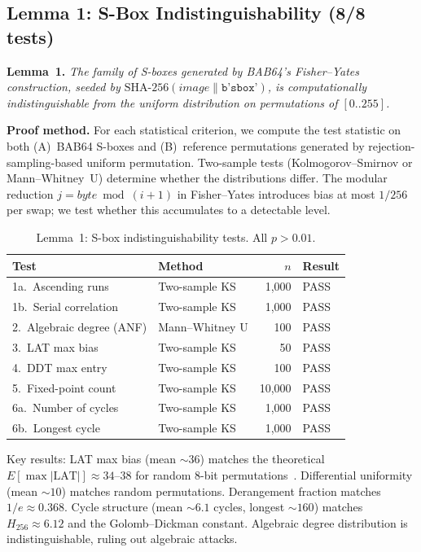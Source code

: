 \documentclass[preprint]{iacrtrans}
\begin{document}
\subsection{Lemma 1: S-Box Indistinguishability (8/8 tests)}

\textbf{Lemma~1.} \emph{The family of S-boxes generated by BAB64's Fisher--Yates construction, seeded by $\mathrm{SHA\text{-}256}(\mathit{image} \| \texttt{b'sbox'})$, is computationally indistinguishable from the uniform distribution on permutations of $[0..255]$.}

\textbf{Proof method.} For each statistical criterion, we compute the test statistic on both (A)~BAB64 S-boxes and (B)~reference permutations generated by rejection-sampling-based uniform permutation. Two-sample tests (Kolmogorov--Smirnov or Mann--Whitney~U) determine whether the distributions differ. The modular reduction $j = \mathit{byte} \bmod (i{+}1)$ in Fisher--Yates introduces bias at most $1/256$ per swap; we test whether this accumulates to a detectable level.

\begin{table}[h]
\centering
\small
\begin{tabular}{@{}llrl@{}}
\toprule
\textbf{Test} & \textbf{Method} & \textbf{$n$} & \textbf{Result} \\
\midrule
1a.\ Ascending runs & Two-sample KS & 1{,}000 & PASS \\
1b.\ Serial correlation & Two-sample KS & 1{,}000 & PASS \\
2.\ Algebraic degree (ANF) & Mann--Whitney U & 100 & PASS \\
3.\ LAT max bias & Two-sample KS & 50 & PASS \\
4.\ DDT max entry & Two-sample KS & 100 & PASS \\
5.\ Fixed-point count & Two-sample KS & 10{,}000 & PASS \\
6a.\ Number of cycles & Two-sample KS & 1{,}000 & PASS \\
6b.\ Longest cycle & Two-sample KS & 1{,}000 & PASS \\
\bottomrule
\end{tabular}
\caption{Lemma~1: S-box indistinguishability tests. All $p > 0.01$.}
\end{table}

Key results: LAT max bias (mean ${\sim}36$) matches the theoretical $E[\max|\mathrm{LAT}|] \approx 34\text{--}38$ for random 8-bit permutations~\cite{daemen2002}. Differential uniformity (mean ${\sim}10$) matches random permutations. Derangement fraction matches $1/e \approx 0.368$. Cycle structure (mean ${\sim}6.1$ cycles, longest ${\sim}160$) matches $H_{256} \approx 6.12$ and the Golomb--Dickman constant. Algebraic degree distribution is indistinguishable, ruling out algebraic attacks.
\end{document}
